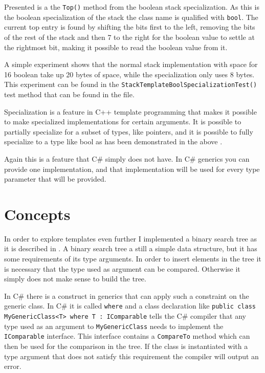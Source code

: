 Presented is a the \lstinline|Top()| method from the boolean stack specialization.
As this is the boolean specialization of the stack the class name is qualified with \texttt{bool}. 
The current top entry is found by shifting the bits first to the left, removing the bits of the rest of the stack and then 7 to the right for the boolean value to settle at the rightmost bit, making it possible to read the boolean value from it.

A simple experiment shows that the normal stack implementation with space for 16 boolean take up 20 bytes of space, while the specialization only uses 8 bytes.
This experiment can be found in the \lstinline|StackTemplateBoolSpecializationTest()| test method that can be found in the  file.

Specialization is a feature in C++ template programming that makes it possible to make specialized implementations for certain arguments.
It is possible to partially specialize for a subset of types, like pointers, and it is possible to fully specialize to a type like bool as has been demonstrated in the above \cite[p.~730]{stroustrup2013c++}.

Again this is a feature that C\# simply does not have. 
In C\# generics you can provide one implementation, and that implementation will be used for every type parameter that will be provided\cite{diff}.

\section{Concepts}
In order to explore templates even further I implemented a binary search tree as it is described in \citet[286]{algo}.
A binary search tree a still a simple data structure, but it has some requirements of its type arguments.
In order to insert elements in the tree it is necessary that the type used as argument can be compared.
Otherwise it simply does not make sense to build the tree.

In C\# there is a construct in generics that can apply such a constraint on the generic class.
In C\# it is called \texttt{where} and a class declaration like 
\lstinline|public class MyGenericClass<T> where T : IComparable| tells the C\# compiler that any type used as an argument to \lstinline|MyGenericClass| needs to implement the \lstinline|IComparable| interface\cite{where}.
This interface contains a \lstinline|CompareTo| method which can then be used for the comparison in the tree.
If the class is instantiated with a type argument that does not satisfy this requirement the compiler will output an error.

